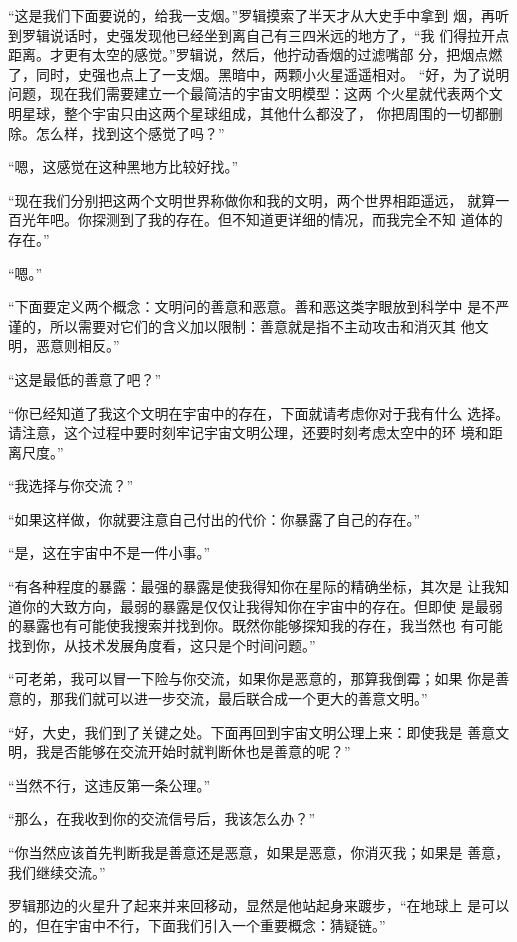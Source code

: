 “这是我们下面要说的，给我一支烟。”罗辑摸索了半天才从大史手中拿到
烟，再听到罗辑说话时，史强发现他已经坐到离自己有三四米远的地方了，“我
们得拉开点距离。才更有太空的感觉。”罗辑说，然后，他拧动香烟的过滤嘴部
分，把烟点燃了，同时，史强也点上了一支烟。黑暗中，两颗小火星遥遥相对。
“好，为了说明问题，现在我们需要建立一个最简洁的宇宙文明模型：这两
个火星就代表两个文明星球，整个宇宙只由这两个星球组成，其他什么都没了，
你把周围的一切都删除。怎么样，找到这个感觉了吗？”

“嗯，这感觉在这种黑地方比较好找。”

“现在我们分别把这两个文明世界称做你和我的文明，两个世界相距遥远，
就算一百光年吧。你探测到了我的存在。但不知道更详细的情况，而我完全不知
道体的存在。”

“嗯。”

“下面要定义两个概念：文明问的善意和恶意。善和恶这类字眼放到科学中
是不严谨的，所以需要对它们的含义加以限制：善意就是指不主动攻击和消灭其
他文明，恶意则相反。”

“这是最低的善意了吧？”

“你已经知道了我这个文明在宇宙中的存在，下面就请考虑你对于我有什么
选择。请注意，这个过程中要时刻牢记宇宙文明公理，还要时刻考虑太空中的环
境和距离尺度。”

“我选择与你交流？”

“如果这样做，你就要注意自己付出的代价：你暴露了自己的存在。”

“是，这在宇宙中不是一件小事。”

“有各种程度的暴露：最强的暴露是使我得知你在星际的精确坐标，其次是
让我知道你的大致方向，最弱的暴露是仅仅让我得知你在宇宙中的存在。但即使
是最弱的暴露也有可能使我搜索并找到你。既然你能够探知我的存在，我当然也
有可能找到你，从技术发展角度看，这只是个时间问题。”

“可老弟，我可以冒一下险与你交流，如果你是恶意的，那算我倒霉；如果
你是善意的，那我们就可以进一步交流，最后联合成一个更大的善意文明。”

“好，大史，我们到了关键之处。下面再回到宇宙文明公理上来：即使我是
善意文明，我是否能够在交流开始时就判断休也是善意的呢？”

“当然不行，这违反第一条公理。”

“那么，在我收到你的交流信号后，我该怎么办？”

“你当然应该首先判断我是善意还是恶意，如果是恶意，你消灭我；如果是
善意，我们继续交流。”

罗辑那边的火星升了起来并来回移动，显然是他站起身来踱步，“在地球上
是可以的，但在宇宙中不行，下面我们引入一个重要概念：猜疑链。”

